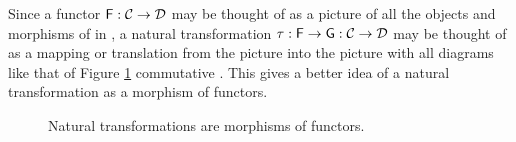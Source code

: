 \begin{remark}
  \label{re:natural-translation}


  Since a functor $\mathsf{F}: \mathcal{C} \to \mathcal{D}$ may be thought of as
  a picture of all the objects and morphisms of  in  , a
  natural transformation $\tau: \mathsf{F} \to \mathsf{G}: \mathcal{C}
  \to \mathcal{D}$ may be thought of as a mapping or translation from the
  picture  into the picture  with all diagrams like
  that of Figure \ref{fig:natural-translation} commutative
  \parencite[16]{maclane-1998}. This gives a better idea of a natural
  transformation as a morphism of functors.
  \begin{figure}[htbp]
    \begin{center}
    \end{center}
    \caption{Natural transformations are morphisms of functors.}
    \label{fig:natural-translation}
  \end{figure}

\end{remark}

